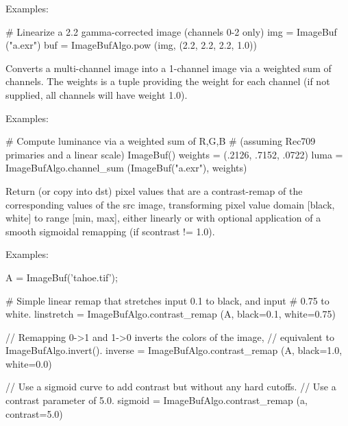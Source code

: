 \smallskip
\noindent Examples:
\begin{code}
    # Linearize a 2.2 gamma-corrected image (channels 0-2 only)
    img = ImageBuf ("a.exr")
    buf = ImageBufAlgo.pow (img, (2.2, 2.2, 2.2, 1.0))
\end{code}
\apiend


 
Converts a multi-channel image into a 1-channel image via a weighted sum
of channels. The {\cf weights} is a tuple providing the weight for each 
channel (if not supplied, all channels will have weight 1.0).

\smallskip
\noindent Examples:
\begin{code}
    # Compute luminance via a weighted sum of R,G,B
    # (assuming Rec709 primaries and a linear scale)
    ImageBuf()
    weights = (.2126, .7152, .0722)
    luma = ImageBufAlgo.channel_sum (ImageBuf("a.exr"), weights)
\end{code}
\apiend


 
\NEW %

Return (or copy into {\cf dst}) pixel values that are a contrast-remap
of the corresponding values of the {\cf src} image, transforming pixel
value domain [black, white] to range [min, max], either linearly or with
optional application of a smooth sigmoidal remapping (if scontrast != 1.0).

\smallskip
\noindent Examples:
\begin{code}
    A = ImageBuf('tahoe.tif');

    # Simple linear remap that stretches input 0.1 to black, and input
    # 0.75 to white.
    linstretch = ImageBufAlgo.contrast_remap (A, black=0.1, white=0.75)

    // Remapping 0->1 and 1->0 inverts the colors of the image,
    // equivalent to ImageBufAlgo.invert().
    inverse = ImageBufAlgo.contrast_remap (A, black=1.0, white=0.0)

    // Use a sigmoid curve to add contrast but without any hard cutoffs.
    // Use a contrast parameter of 5.0.
    sigmoid = ImageBufAlgo.contrast_remap (a, contrast=5.0)
\end{code}
\apiend

